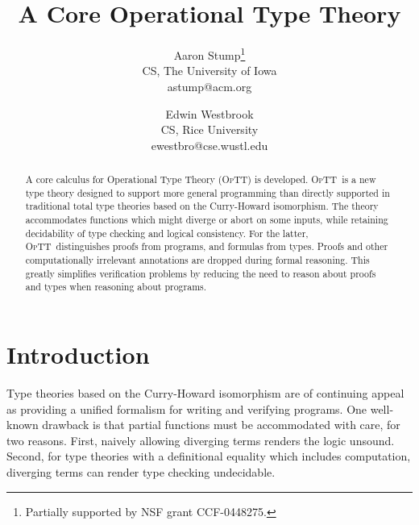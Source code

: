 \documentclass{fundam}
\newcommand{\optt}{\textsc{OpTT}}
\begin{document}
\title{A Core Operational Type Theory}

\author{Aaron Stump\thanks{Partially supported by NSF grant CCF-0448275.} \\
CS, The University of Iowa \\
astump{@}acm.org \\
\and
Edwin Westbrook \\
CS, Rice University \\
ewestbro{@}cse.wustl.edu}





\maketitle


\begin{abstract}
A core calculus for Operational Type Theory (\optt) is developed.
\optt\ is a new type theory designed to support more general
programming than directly supported in traditional total type theories
based on the Curry-Howard isomorphism.  The theory accommodates
functions which might diverge or abort on some inputs, while retaining
decidability of type checking and logical consistency.  For the
latter, \optt\ distinguishes proofs from programs, and formulas from
types.  Proofs and other computationally irrelevant annotations are
dropped during formal reasoning.  This greatly simplifies verification
problems by reducing the need to reason about proofs and types when
reasoning about programs.
\end{abstract}

\section{Introduction}

Type theories based on the Curry-Howard isomorphism are of continuing
appeal as providing a unified formalism for writing and verifying
programs.  One well-known drawback is that partial functions must be
accommodated with care, for two reasons.  First, naively allowing
diverging terms renders the logic unsound.  Second, for type theories
with a definitional equality which includes computation, diverging
terms can render type checking undecidable.
\end{document}

